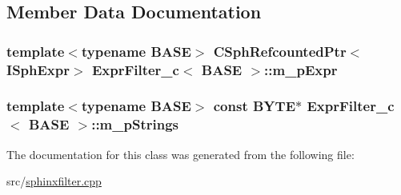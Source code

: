 \subsection{Member Data Documentation}
\hypertarget{classExprFilter__c_a10ab142f3d802a2d7d7b0d0bbc47fc51}{
\subsubsection[{m\-\_\-p\-Expr}]{\setlength{\rightskip}{0pt plus 5cm}template$<$typename B\-A\-S\-E$>$ {\bf C\-Sph\-Refcounted\-Ptr}$<${\bf I\-Sph\-Expr}$>$ {\bf Expr\-Filter\-\_\-c}$<$ B\-A\-S\-E $>$\-::m\-\_\-p\-Expr\hspace{0.3cm}{\ttfamily [protected]}}}\label{classExprFilter__c_a10ab142f3d802a2d7d7b0d0bbc47fc51}
\hypertarget{classExprFilter__c_a5de7adf4fd00f75657f4da64fa72d367}{
\subsubsection[{m\-\_\-p\-Strings}]{\setlength{\rightskip}{0pt plus 5cm}template$<$typename B\-A\-S\-E$>$ const {\bf B\-Y\-T\-E}$\ast$ {\bf Expr\-Filter\-\_\-c}$<$ B\-A\-S\-E $>$\-::m\-\_\-p\-Strings\hspace{0.3cm}{\ttfamily [protected]}}}\label{classExprFilter__c_a5de7adf4fd00f75657f4da64fa72d367}


The documentation for this class was generated from the following file\-:\begin{DoxyCompactItemize}
\item 
src/\hyperlink{sphinxfilter_8cpp}{sphinxfilter.\-cpp}\end{DoxyCompactItemize}
